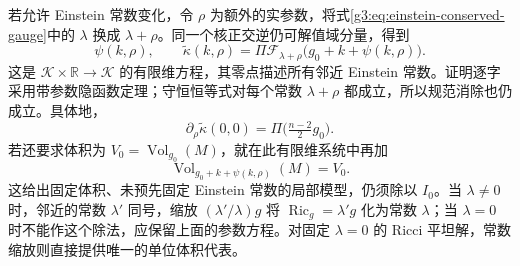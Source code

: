 若允许 Einstein 常数变化，令 \(\rho\) 为额外的实参数，将式\eqref{g3:eq:einstein-conserved-gauge}中的 \(\lambda\) 换成 \(\lambda+\rho\)。同一个核正交逆仍可解值域分量，得到
\begin{equation}\label{g3:eq:einstein-variable-constant-model}
	\psi(k,\rho),\qquad
	\widetilde\kappa(k,\rho)=\Pi\mathcal F_{\lambda+\rho}
	\bigl(g_0+k+\psi(k,\rho)\bigr).
\end{equation}
这是 \(\mathcal K\times\mathbb R\to\mathcal K\) 的有限维方程，其零点描述所有邻近 Einstein 常数。证明逐字采用带参数隐函数定理；守恒恒等式对每个常数 \(\lambda+\rho\) 都成立，所以规范消除也仍成立。具体地，
\[
	\partial_\rho\widetilde\kappa(0,0)
	=\Pi\bigl(\tfrac{n-2}{2}g_0\bigr).
\]
若还要求体积为 \(V_0=\operatorname{Vol}_{g_0}(M)\)，就在此有限维系统中再加
\[
	\operatorname{Vol}_{g_0+k+\psi(k,\rho)}(M)=V_0.
\]
这给出固定体积、未预先固定 Einstein 常数的局部模型，仍须除以 \(I_0\)。当 \(\lambda\ne0\) 时，邻近的常数 \(\lambda'\) 同号，缩放 \((\lambda'/\lambda)g\) 将 \(\operatorname{Ric}_g=\lambda'g\) 化为常数 \(\lambda\)；当 \(\lambda=0\) 时不能作这个除法，应保留上面的参数方程。对固定 \(\lambda=0\) 的 Ricci 平坦解，常数缩放则直接提供唯一的单位体积代表。
